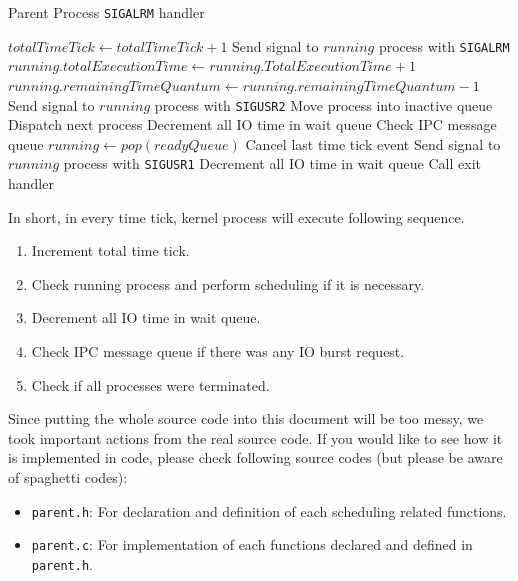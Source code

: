 \documentclass{homework}
\begin{document}
\begin{algorithm}
\caption{Parent Process \texttt{SIGALRM} handler}\label{alg:cap}
\begin{algorithmic}
\State $totalTimeTick \gets totalTimeTick + 1$
    \State Send signal to $running$ process with \texttt{SIGALRM} 
    \State $running.totalExecutionTime \gets running.TotalExecutionTime + 1$
    \State $running.remainingTimeQuantum \gets running.remainingTimeQuantum - 1$
     
        \State Send signal to $running$ process with \texttt{SIGUSR2} 
        \State Move process into inactive queue
        \State Dispatch next process
    \EndIf
    \State Decrement all IO time in wait queue
    \State Check IPC message queue 
\Else
        \State $running \gets pop(readyQueue)$
        \State Cancel last time tick event 
        \State Send signal to $running$ process with \texttt{SIGUSR1} 
    \Else 
         
            \State Decrement all IO time in wait queue
        \Else {}
            \State Call exit handler
        \EndIf
    \EndIf
\EndIf
\end{algorithmic}
\end{algorithm}

In short, in every time tick, kernel process will execute following sequence.
\begin{enumerate}
    \item Increment total time tick.
    \item Check running process and perform scheduling if it is necessary.
    \item Decrement all IO time in wait queue.
    \item Check IPC message queue if there was any IO burst request.
    \item Check if all processes were terminated. 
\end{enumerate}
Since putting the whole source code into this document will be too messy, we took important actions from the real source code. If you would like to see how it is implemented in code, please check following source codes (but please be aware of spaghetti codes):
\begin{itemize}
    \item \texttt{parent.h}: For declaration and definition of each scheduling related functions.
    \item \texttt{parent.c}: For implementation of each functions declared and defined in \texttt{parent.h}.
\end{itemize}
\pagebreak
\end{document}
